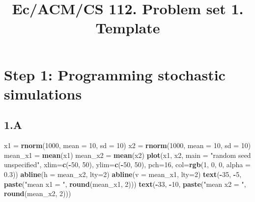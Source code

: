 \documentclass[
]{article}
\title{Ec/ACM/CS 112. Problem set 1. Template}
\author{}
\date{\vspace{-2.5em}}
\newenvironment{Shaded}{\begin{snugshade}}{\end{snugshade}}
\newcommand{\AttributeTok}[1]{\textcolor[rgb]{0.13,0.29,0.53}{#1}}
\newcommand{\DecValTok}[1]{\textcolor[rgb]{0.00,0.00,0.81}{#1}}
\newcommand{\FloatTok}[1]{\textcolor[rgb]{0.00,0.00,0.81}{#1}}
\newcommand{\FunctionTok}[1]{\textcolor[rgb]{0.13,0.29,0.53}{\textbf{#1}}}
\newcommand{\NormalTok}[1]{#1}
\newcommand{\OtherTok}[1]{\textcolor[rgb]{0.56,0.35,0.01}{#1}}
\newcommand{\SpecialCharTok}[1]{\textcolor[rgb]{0.81,0.36,0.00}{\textbf{#1}}}
\newcommand{\StringTok}[1]{\textcolor[rgb]{0.31,0.60,0.02}{#1}}
\begin{document}
\maketitle

\hypertarget{step-1-programming-stochastic-simulations}{%
\section{Step 1: Programming stochastic
simulations}\label{step-1-programming-stochastic-simulations}}

\hypertarget{a}{%
\subsection{1.A}\label{a}}

\begin{Shaded}
\begin{Highlighting}[]
\NormalTok{x1 }\OtherTok{=} \FunctionTok{rnorm}\NormalTok{(}\DecValTok{1000}\NormalTok{, }\AttributeTok{mean =} \DecValTok{10}\NormalTok{, }\AttributeTok{sd =} \DecValTok{10}\NormalTok{)}
\NormalTok{x2 }\OtherTok{=} \FunctionTok{rnorm}\NormalTok{(}\DecValTok{1000}\NormalTok{, }\AttributeTok{mean =} \DecValTok{10}\NormalTok{, }\AttributeTok{sd =} \DecValTok{10}\NormalTok{)}
\NormalTok{mean\_x1 }\OtherTok{=} \FunctionTok{mean}\NormalTok{(x1)}
\NormalTok{mean\_x2 }\OtherTok{=} \FunctionTok{mean}\NormalTok{(x2)}
\FunctionTok{plot}\NormalTok{(x1, x2, }\AttributeTok{main =} \StringTok{"random seed unspecified"}\NormalTok{, }\AttributeTok{xlim=}\FunctionTok{c}\NormalTok{(}\SpecialCharTok{{-}}\DecValTok{50}\NormalTok{, }\DecValTok{50}\NormalTok{), }
     \AttributeTok{ylim=}\FunctionTok{c}\NormalTok{(}\SpecialCharTok{{-}}\DecValTok{50}\NormalTok{, }\DecValTok{50}\NormalTok{), }\AttributeTok{pch=}\DecValTok{16}\NormalTok{, }\AttributeTok{col=}\FunctionTok{rgb}\NormalTok{(}\DecValTok{1}\NormalTok{, }\DecValTok{0}\NormalTok{, }\DecValTok{0}\NormalTok{, }\AttributeTok{alpha =} \FloatTok{0.3}\NormalTok{))}
\FunctionTok{abline}\NormalTok{(}\AttributeTok{h =}\NormalTok{ mean\_x2, }\AttributeTok{lty=}\DecValTok{2}\NormalTok{)}
\FunctionTok{abline}\NormalTok{(}\AttributeTok{v =}\NormalTok{ mean\_x1, }\AttributeTok{lty=}\DecValTok{2}\NormalTok{)}
\FunctionTok{text}\NormalTok{(}\SpecialCharTok{{-}}\DecValTok{35}\NormalTok{, }\SpecialCharTok{{-}}\DecValTok{5}\NormalTok{, }\FunctionTok{paste}\NormalTok{(}\StringTok{"mean x1 = "}\NormalTok{, }\FunctionTok{round}\NormalTok{(mean\_x1, }\DecValTok{2}\NormalTok{)))}
\FunctionTok{text}\NormalTok{(}\SpecialCharTok{{-}}\DecValTok{33}\NormalTok{, }\SpecialCharTok{{-}}\DecValTok{10}\NormalTok{, }\FunctionTok{paste}\NormalTok{(}\StringTok{"mean x2 = "}\NormalTok{, }\FunctionTok{round}\NormalTok{(mean\_x2, }\DecValTok{2}\NormalTok{)))}
\end{Highlighting}
\end{Shaded}
\end{document}
